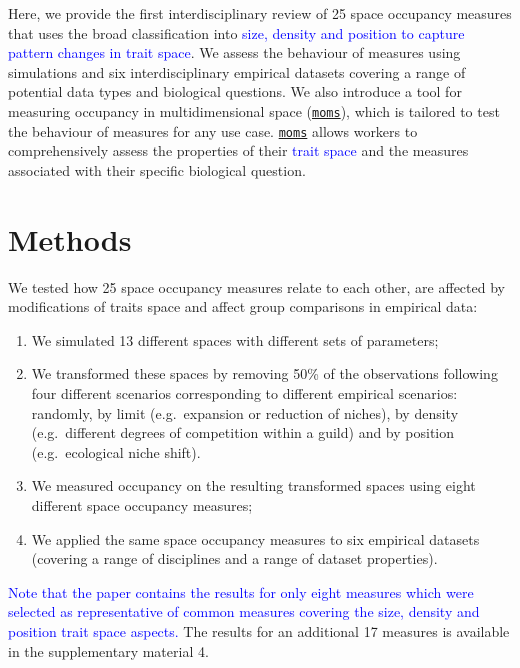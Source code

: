 \documentclass[]{article}
\providecommand{\tightlist}{%
  \setlength{\itemsep}{0pt}\setlength{\parskip}{0pt}}
\begin{document}
Here, we provide the first interdisciplinary review of 25 space
occupancy measures that uses the broad classification into
\textcolor{blue}{size, density and position to capture pattern changes in trait space}.
We assess the behaviour of measures using simulations and six
interdisciplinary empirical datasets covering a range of potential data
types and biological questions. We also introduce a tool for measuring
occupancy in multidimensional space
(\href{https://tguillerme.shinyapps.io/moms/}{\texttt{moms}}), which is
tailored to test the behaviour of measures for any use case.
\href{https://tguillerme.shinyapps.io/moms/}{\texttt{moms}} allows
workers to comprehensively assess the properties of their
\textcolor{blue}{trait space} and the measures associated
with their specific biological question.

\section{Methods}\label{methods}

We tested how 25 space occupancy measures relate to each other, are
affected by modifications of traits space and affect group comparisons
in empirical data:

\begin{enumerate}
\def\labelenumi{\arabic{enumi}.}
\tightlist
\item
  We simulated 13 different spaces with different sets of parameters;
\item
  We transformed these spaces by removing 50\% of the observations
  following four different scenarios corresponding to different
  empirical scenarios: randomly, by limit (e.g.~expansion or reduction
  of niches), by density (e.g.~different degrees of competition within a
  guild) and by position (e.g.~ecological niche shift).
\item
  We measured occupancy on the resulting transformed spaces using eight
  different space occupancy measures;
\item
  We applied the same space occupancy measures to six empirical datasets
  (covering a range of disciplines and a range of dataset properties).
\end{enumerate}

\textcolor{blue}{Note that the paper contains the results for only eight measures which were selected as representative of common measures covering the size, density and position trait space aspects.}
The results for an additional 17 measures is available in the
supplementary material 4.
\end{document}
